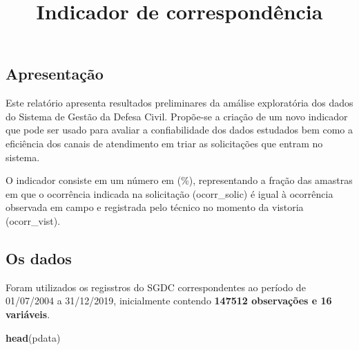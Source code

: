 \documentclass[
]{article}
\title{Indicador de correspondência}
\author{}
\date{\vspace{-2.5em}}
\newenvironment{Shaded}{\begin{snugshade}}{\end{snugshade}}
\newcommand{\KeywordTok}[1]{\textcolor[rgb]{0.13,0.29,0.53}{\textbf{#1}}}
\newcommand{\NormalTok}[1]{#1}
\begin{document}
\maketitle

\hypertarget{apresentauxe7uxe3o}{%
\subsection{Apresentação}\label{apresentauxe7uxe3o}}

Este relatório apresenta resultados preliminares da amálise exploratória
dos dados do Sistema de Gestão da Defesa Civil. Propõe-se a criação de
um novo indicador que pode ser usado para avaliar a confiabilidade dos
dados estudados bem como a eficiência dos canais de atendimento em triar
as solicitações que entram no sistema.

O indicador consiste em um número em (\%), representando a fração das
amastras em que o ocorrência indicada na solicitação (ocorr\_solic) é
igual à ocorrência observada em campo e registrada pelo técnico no
momento da vistoria (ocorr\_vist).

\hypertarget{os-dados}{%
\subsection{Os dados}\label{os-dados}}

Foram utilizados os regisstros do SGDC correspondentes ao período de
01/07/2004 a 31/12/2019, inicialmente contendo \textbf{147512
observações e 16 variáveis}.

\begin{Shaded}
\begin{Highlighting}[]
\KeywordTok{head}\NormalTok{(pdata)}
\end{Highlighting}
\end{Shaded}
\end{document}
